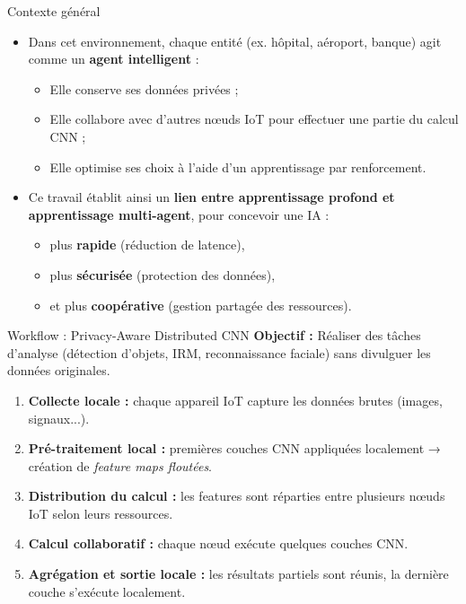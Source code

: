 \documentclass{beamer}
\begin{document}
\begin{frame}{Contexte général}
\begin{itemize}
    \item Dans cet environnement, chaque entité (ex. hôpital, aéroport, banque) agit comme un \textbf{agent intelligent} :
    \begin{itemize}
        \item Elle conserve ses données privées ;
        \item Elle collabore avec d’autres nœuds IoT pour effectuer une partie du calcul CNN ;
        \item Elle optimise ses choix à l’aide d’un apprentissage par renforcement.
    \end{itemize}
    \item Ce travail établit ainsi un \textbf{lien entre apprentissage profond et apprentissage multi-agent}, pour concevoir une IA :
    \begin{itemize}
        \item plus \textbf{rapide} (réduction de latence),
        \item plus \textbf{sécurisée} (protection des données),
        \item et plus \textbf{coopérative} (gestion partagée des ressources).
    \end{itemize}
\end{itemize}
\end{frame}



\begin{frame}{Workflow : Privacy-Aware Distributed CNN}
\textbf{Objectif :} Réaliser des tâches d’analyse (détection d’objets, IRM, reconnaissance faciale) sans divulguer les données originales.
\begin{enumerate}
    \item \textbf{Collecte locale :} chaque appareil IoT capture les données brutes (images, signaux...).
    \item \textbf{Pré-traitement local :} premières couches CNN appliquées localement → création de \textit{feature maps floutées}.
    \item \textbf{Distribution du calcul :} les features sont réparties entre plusieurs nœuds IoT selon leurs ressources.
    \item \textbf{Calcul collaboratif :} chaque nœud exécute quelques couches CNN.
    \item \textbf{Agrégation et sortie locale :} les résultats partiels sont réunis, la dernière couche s’exécute localement.
\end{enumerate}
\end{frame}
\end{document}
